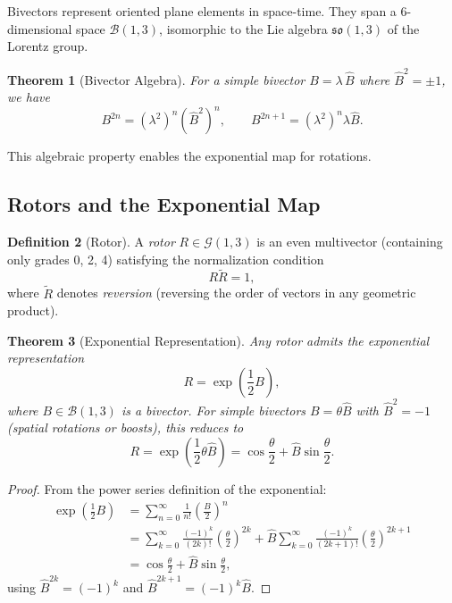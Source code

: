 \documentclass[11pt,a4paper]{article}
\numberwithin{equation}{section}
\theoremstyle{plain}
\newtheorem{theorem}{Theorem}[section]
\theoremstyle{definition}
\newtheorem{definition}[theorem]{Definition}
\theoremstyle{remark}
\newcommand{\Cl}{\mathcal{G}}               %
\newcommand{\rev}[1]{\widetilde{#1}}       %
\newcommand{\Biv}{\mathcal{B}}             %
\begin{document}
Bivectors represent oriented plane elements in space-time. They span a 6-dimensional space $\Biv(1,3)$, isomorphic to the Lie algebra $\mathfrak{so}(1,3)$ of the Lorentz group.

\begin{theorem}[Bivector Algebra]
For a simple bivector $B = \lambda \, \hat{B}$ where $\hat{B}^2 = \pm 1$, we have
\begin{equation}
B^{2n} = (\lambda^2)^n (\hat{B}^2)^n, \qquad B^{2n+1} = (\lambda^2)^n \lambda \hat{B}.
\label{eq:bivector-powers}
\end{equation}
\end{theorem}

This algebraic property enables the exponential map for rotations.

\subsection{Rotors and the Exponential Map}

\begin{definition}[Rotor]
A \emph{rotor} $R \in \Cl(1,3)$ is an even multivector (containing only grades 0, 2, 4) satisfying the normalization condition
\begin{equation}
R \rev{R} = 1,
\label{eq:rotor-normalization}
\end{equation}
where $\rev{R}$ denotes \emph{reversion} (reversing the order of vectors in any geometric product).
\end{definition}

\begin{theorem}[Exponential Representation]
Any rotor admits the exponential representation
\begin{equation}
R = \exp\left(\frac{1}{2}B\right),
\label{eq:rotor-exponential}
\end{equation}
where $B \in \Biv(1,3)$ is a bivector. For simple bivectors $B = \theta \hat{B}$ with $\hat{B}^2 = -1$ (spatial rotations or boosts), this reduces to
\begin{equation}
R = \exp\left(\frac{1}{2}\theta\hat{B}\right) = \cos\frac{\theta}{2} + \hat{B}\sin\frac{\theta}{2}.
\label{eq:rotor-euler}
\end{equation}
\end{theorem}

\begin{proof}
From the power series definition of the exponential:
\begin{align}
\exp\left(\frac{1}{2}B\right) &= \sum_{n=0}^\infty \frac{1}{n!}\left(\frac{B}{2}\right)^n\\
&= \sum_{k=0}^\infty \frac{(-1)^k}{(2k)!}\left(\frac{\theta}{2}\right)^{2k} + \hat{B}\sum_{k=0}^\infty \frac{(-1)^k}{(2k+1)!}\left(\frac{\theta}{2}\right)^{2k+1}\\
&= \cos\frac{\theta}{2} + \hat{B}\sin\frac{\theta}{2},
\end{align}
using $\hat{B}^{2k} = (-1)^k$ and $\hat{B}^{2k+1} = (-1)^k\hat{B}$.
\end{proof}
\end{document}
